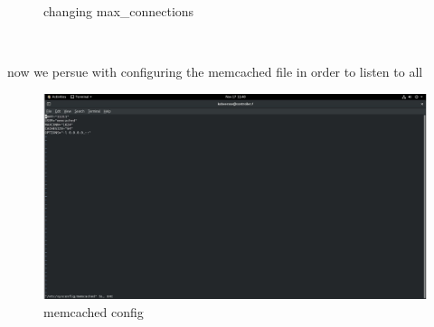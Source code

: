\begin{spacing}{1.2}
\begin{figure}[!htb]
\begin{center}
\end{center} 
\caption{changing max_connections} 
\end{figure}  \FloatBarrier
\\
\par now we persue with configuring the memcached file in order to listen to all
\\
\begin{figure}[!htb] 
\begin{center} 
\includegraphics[width=1\linewidth]{Cloud/Pre-Requirements/memcached config} 
\end{center} 
\caption{memcached config} 
\end{figure}  \FloatBarrier
\\

\end{spacing}
